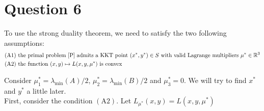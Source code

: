 \documentclass{article}
\newcommand{\R}{\mathbb{R}}
\begin{document}
\section*{Question 6}
To use the strong duality theorem, we need to satisfy the two following assumptions:
\begin{align*}
(\text{A}1) &  \text{ the primal problem \eqref{P} admits a KKT point } (x^*,y^*)\in S \text{ with valid Lagrange multipliers } \mu^*\in \R^3 \\
(\text{A}2) &  \text{ the function } (x,y)\mapsto L(x,y,\mu^*) \text{ is convex}
\end{align*}

Consider $\mu_1^*=\lambda_{\min} (A)/2$, $\mu_2^*=\lambda_{\min} (B)/2$ and $\mu_3^*=0$. We will try to find $x^*$ and $y^*$ a little later.\\

\noindent First, consider the condition $(\text{A}2)$. Let $L_{\mu^*}(x,y) = L(x,y,\mu^*)$
\end{document}
